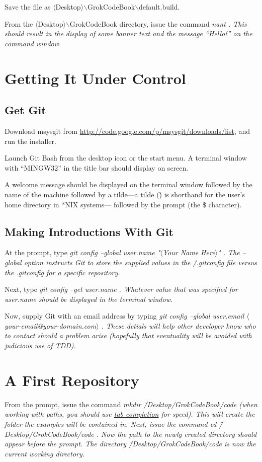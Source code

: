 Save the file as $\langle$Desktop$\rangle$$\backslash$GrokCodeBook$\backslash$default.build.

From the $\langle$Desktop$\rangle$$\backslash$GrokCodeBook directory, issue the command \em nant \em. This should result in the display of some banner text and the message ``Hello!'' on the command window.

\section{Getting It Under Control}
\subsection{Get Git}
Download msysgit from \url{http://code.google.com/p/msysgit/downloads/list}, and run the installer.

Launch Git Bash from the desktop icon or the start menu. A terminal window with ``MINGW32'' in the title bar should display on screen.

A welcome message should be displayed on the terminal window followed by the name of the machine followed by a tilde---a tilde (\~) is shorthand for the user's home directory in *NIX systems--- followed by the prompt (the \$ character).

\subsection{Making Introductions With Git}
At the prompt, type \em git config --global user.name "$\langle$Your Name Here$\rangle$" \em. The \em --global \em option instructs Git to store the supplied values in the \em \~/.gitconfig \em file versus the \em .gitconfig \em for a specific repository.

Next, type \em git config --get user.name \em. Whatever value that was specified for \em user.name \em should be displayed in the terminal window.

Now, supply Git with an email address by typing \em git config --global user.email $\langle$your-email@your-domain.com$\rangle$ \em. These detials will help other developer know who to contact should a problem arise (hopefully that eventuality will be avoided with judicious use of \gls{TDD}).

\section{A First Repository}
From the prompt, issue the command \em mkdir \~/Desktop/GrokCodeBook/code \em (when working with paths, you should use \hyperref[tab-completion]{tab completion} for speed). This will create the folder the examples will be contained in. Next, issue the command \em cd \~/Desktop/GrokCodeBook/code \em. Now the path to the newly created directory should appear before the prompt. The directory \em \~/Desktop/GrokCodeBook/code \em is now the current working directory.

